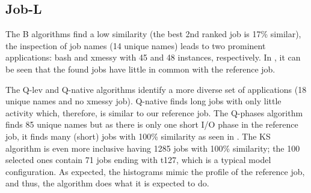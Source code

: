 \documentclass{jhps}
\begin{document}
%
%

\subsection{Job-L}

The B algorithms find a low similarity (the best 2nd ranked job is 17\% similar), the inspection of job names (14 unique names) leads to two prominent applications: bash and xmessy with 45 and 48 instances, respectively.
In , it can be seen that the found jobs have little in common with the reference job.

The Q-lev and Q-native algorithms identify a more diverse set of applications (18 unique names and no xmessy job).
Q-native  finds long jobs with only little activity which, therefore, is similar to our reference job.
The Q-phases algorithm finds 85 unique names but as there is only one short I/O phase in the reference job, it finds many (short) jobs with 100\% similarity as seen in .
The KS algorithm is even more inclusive having 1285 jobs with 100\% similarity; the 100 selected ones contain 71 jobs ending with t127, which is a typical model configuration.
As expected, the histograms mimic the profile of the reference job, and thus, the algorithm does what it is expected to do.
\end{document}
